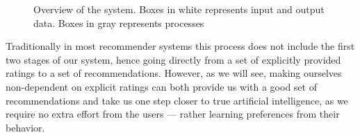 \begin{figure}[H]
  \caption{Overview of the system. Boxes in white represents input and output
  data. Boxes in gray represents processes}
\end{figure}

Traditionally in most recommender systems this process does not include the
first two stages of our system, hence going directly from a set of explicitly
provided ratings to a set of recommendations. However, as we will see, making
ourselves non-dependent on explicit ratings can both provide us with a good
set of recommendations and take us one step closer to true artificial
intelligence, as we require no extra effort from the users --- rather learning
preferences from their behavior.

